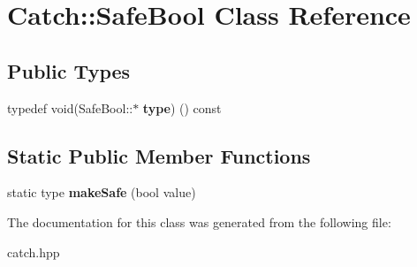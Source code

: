 \hypertarget{classCatch_1_1SafeBool}{}\section{Catch\+:\+:Safe\+Bool Class Reference}
\label{classCatch_1_1SafeBool}
\subsection*{Public Types}
\begin{DoxyCompactItemize}
\item 
\mbox{\label{classCatch_1_1SafeBool_a39eef9baed296299d625a54d54a2a958}} 
typedef void(Safe\+Bool\+::$\ast$ {\bfseries type}) () const
\end{DoxyCompactItemize}
\subsection*{Static Public Member Functions}
\begin{DoxyCompactItemize}
\item 
\mbox{\label{classCatch_1_1SafeBool_af0ea63d9820f8bf7a8b76377913c4e77}} 
static type {\bfseries make\+Safe} (bool value)
\end{DoxyCompactItemize}


The documentation for this class was generated from the following file\+:\begin{DoxyCompactItemize}
\item 
catch.\+hpp\end{DoxyCompactItemize}
